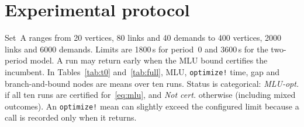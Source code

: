 \section{Experimental protocol}

Set~A ranges from 20 vertices, 80 links and 40 demands to 400 vertices, 2000 links and
6000 demands.
Limits are 1800\,s for period~0 and 3600\,s for the two-period model.
A run may return early when the MLU bound certifies the incumbent.
In Tables~\ref{tab:t0} and~\ref{tab:full}, MLU, \texttt{optimize!} time, gap and branch-and-bound
nodes are means over ten runs.
Status is categorical: \emph{MLU-opt.} if all ten runs are certified for~\eqref{eq:mlu}, and
\emph{Not cert.} otherwise (including mixed outcomes).
An \texttt{optimize!} mean can slightly exceed the configured limit because a call is recorded
only when it returns.
